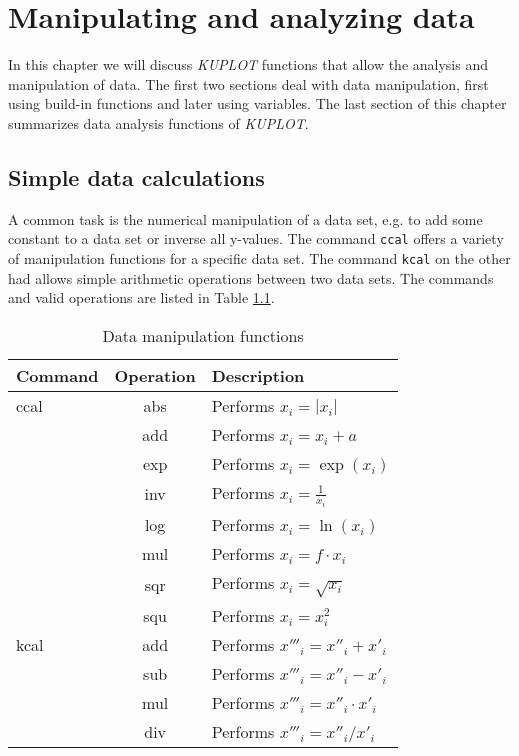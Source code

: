 
\chapter{Manipulating and analyzing data \label {mat}}

In this chapter we will discuss {\it KUPLOT} functions that allow the
analysis and manipulation of data. The first two sections deal with
data manipulation, first using build-in functions and later using
variables. The last section of this chapter summarizes data analysis
functions of {\it KUPLOT}.


\section{Simple data calculations \label{mat-buildin}}

A common task is the numerical manipulation of a data set, e.g.  to
add some constant to a data set or inverse all y-values.  The
command {\tt ccal} offers a variety of manipulation functions for a
specific data set.  The command {\tt kcal} on the other had allows
simple arithmetic operations between two data sets.  The commands
and valid operations are listed in Table \ref{mat-tab1}.

\begin{table}[!b]
\centering
\begin{tabular}{|l|c|l|}
  \hline
  {\bf Command} & {\bf Operation} & {\bf Description} \\
  \hline\hline
   ccal & abs & Performs $x_{i} = |x_{i}|$ \\
        & add & Performs $x_{i} = x_{i} + a$ \\
        & exp & Performs $x_{i} = \exp (x_{i})$ \\
        & inv & Performs $x_{i} = \frac {1} {x_{i}}$ \\
        & log & Performs $x_{i} = \ln  (x_{i})$ \\
        & mul & Performs $x_{i} = f \cdot x_{i}$ \\
        & sqr & Performs $x_{i} = \sqrt {x_{i}}$ \\
        & squ & Performs $x_{i} = x_{i}^{2}$ \\
  \hline
  kcal  & add & Performs $x'''_{i} = x''_{i} + x'_{i}$ \\
        & sub & Performs $x'''_{i} = x''_{i} - x'_{i}$ \\
        & mul & Performs $x'''_{i} = x''_{i} \cdot x'_{i}$ \\
        & div & Performs $x'''_{i} = x''_{i} / x'_{i}$ \\
  \hline
\end{tabular}
\caption{\label{mat-tab1}Data manipulation functions}
\end{table}

